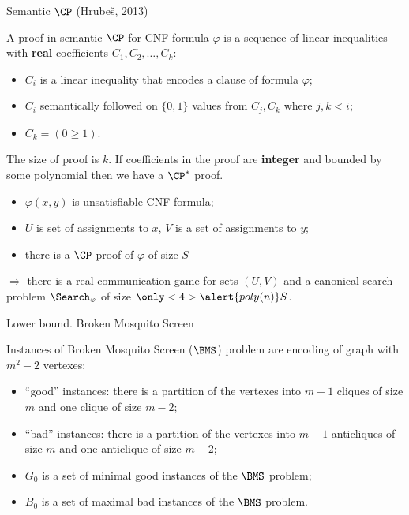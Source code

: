 \begin{frame}{Semantic $\CP$ (Hrube{\v{s}}, 2013)}

    A proof in semantic $\CP$ for CNF formula $\varphi$ is a sequence of linear inequalities with \textbf{real} coefficients
    $C_1, C_2, \dots, C_k$:
    \begin{itemize}
        \item $C_i$ is a linear inequality that encodes a clause of formula $\varphi$;
        \item $C_i$ semantically followed on $\{0, 1\}$ values from $C_j, C_k$ where $j, k < i$;
        \item $C_k = (0 \ge 1)$.
    \end{itemize}

    \pause
    The size of proof is $k$. If coefficients in the proof are \textbf{integer} and bounded by some polynomial then we have a
    $\CP^*$ proof.

    \pause

    \begin{lemma}
        \begin{itemize}
            \item $\varphi(x, y)$ is unsatisfiable CNF formula;
            \item $U$ is set of assignments to $x$, $V$ is a set of assignments to $y$;
            \item there is a $\CP$  proof of $\varphi$ of size $S$
        \end{itemize}
        $\Rightarrow$ there is a real  communication game for sets $(U, V)$ and a canonical search
        problem $\Search_{\varphi}$ of size $\only<4>{\alert{poly(n)}} S$.
    \end{lemma}

\end{frame}

\begin{frame}{Lower bound. Broken Mosquito Screen}

    Instances of Broken Mosquito Screen ($\BMS$) problem are encoding of graph with $m^2 - 2$ vertexes:
    \begin{itemize}
        \pause
        \item ``good'' instances: there is a partition of the vertexes into $m - 1$ cliques of size $m$ and one clique of size
            $m - 2$;
        \pause
		\item ``bad'' instances: there is a partition of the vertexes into $m - 1$ anticliques of size $m$ and one anticlique
            of size $m - 2$;
        \pause
        \item $G_0$ is a set of minimal good instances of the $\BMS$ problem;
        \pause
        \item $B_0$ is a set of maximal bad instances of the $\BMS$ problem.
    \end{itemize}

\end{frame}

